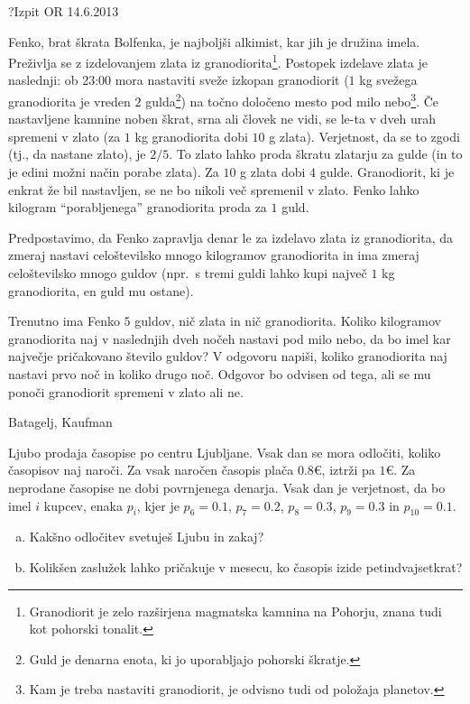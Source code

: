 \begin{naloga}{?}{Izpit OR 14.6.2013}
\begin{vprasanje}
Fenko, brat škrata Bolfenka, je najboljši alkimist, kar jih je družina imela.
Preživlja se z izdelovanjem zlata iz granodiorita\footnote{
Granodiorit je zelo razširjena magmatska kamnina na Pohorju,
znana tudi kot pohorski tonalit.
}.
Postopek izdelave zlata je naslednji:
ob 23:00 mora nastaviti sveže izkopan granodiorit
($1$ kg svežega granodiorita je vreden $2$ gulda\footnote{
Guld je denarna enota, ki jo uporabljajo pohorski škratje.
})
na točno določeno mesto pod milo nebo\footnote{
Kam je treba nastaviti granodiorit, je odvisno tudi od položaja planetov.
}.
Če nastavljene kamnine noben škrat, srna ali človek ne vidi,
se le-ta v dveh urah spremeni v zlato
(za $1$ kg granodiorita dobi $10$ g zlata).
Verjetnost, da se to zgodi (tj., da nastane zlato), je $2/5$.
To zlato lahko proda škratu zlatarju za gulde
(in to je edini možni način porabe zlata).
Za $10$ g zlata dobi $4$ gulde.
Granodiorit, ki je enkrat že bil nastavljen,
se ne bo nikoli več spremenil v zlato.
Fenko lahko kilogram ``porabljenega'' granodiorita proda za $1$ guld.

Predpostavimo, da Fenko zapravlja denar le za izdelavo zlata iz granodiorita,
da zmeraj nastavi celoštevilsko mnogo kilogramov granodiorita
in ima zmeraj celoštevilsko mnogo guldov
(npr.~s tremi guldi lahko kupi največ $1$ kg granodiorita, en guld mu ostane).

Trenutno ima Fenko $5$ guldov, nič zlata in nič granodiorita.
Koliko kilogramov granodiorita
naj v naslednjih dveh nočeh nastavi pod milo nebo,
da bo imel kar največje pričakovano število guldov?
V odgovoru napiši,
koliko granodiorita naj nastavi prvo noč in koliko drugo noč.
Odgovor bo odvisen od tega,
ali se mu ponoči granodiorit spremeni v zlato ali ne.
\end{vprasanje}
\begin{odgovor}
\end{odgovor}
\end{naloga}


\begin{naloga}{Batagelj, Kaufman}{\cite[Naloga~4.3]{bk}}
\begin{vprasanje}
Ljubo prodaja časopise po centru Ljubljane.
Vsak dan se mora odločiti, koliko časopisov naj naroči.
Za vsak naročen časopis plača $0.8 €$, iztrži pa $1 €$.
Za neprodane časopise ne dobi povrnjenega denarja.
Vsak dan je verjetnost, da bo imel $i$ kupcev, enaka $p_i$,
kjer je $p_6 = 0.1$, $p_7 = 0.2$, $p_8 = 0.3$, $p_9 = 0.3$ in $p_{10} = 0.1$.
\begin{enumerate}[(a)]
\item Kakšno odločitev svetuješ Ljubu in zakaj?
\item Kolikšen zaslužek lahko pričakuje v mesecu,
ko časopis izide petindvajsetkrat?
\end{enumerate}
\end{vprasanje}
\begin{odgovor}
\end{odgovor}
\end{naloga}



